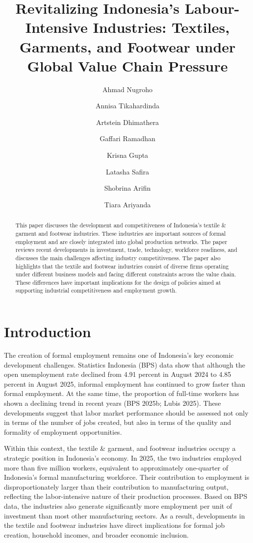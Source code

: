 \documentclass[
  manuscript=article,
  layout=publish,
  year=2026,
  volume=1,
]{den}
\title{Revitalizing Indonesia's Labour-Intensive Industries: Textiles,
Garments, and Footwear under Global Value Chain Pressure}
\author{Ahmad Nugroho}
\affiliation{Dewan Ekonomi Nasional}
\author{Annisa Tikahardinda}
\affiliation{Dewan Ekonomi Nasional}
\author{Artstein Dhimathera}
\affiliation{Dewan Ekonomi Nasional}
\author{Gaffari Ramadhan}
\affiliation{Dewan Ekonomi Nasional}
\author{Krisna Gupta \orcid{0000-0001-8695-0514}}
\affiliation{Dewan Ekonomi Nasional}
\author{Latasha Safira}
\affiliation{Dewan Ekonomi Nasional}
\author{Shobrina Arifin}
\affiliation{Dewan Ekonomi Nasional}
\author{Tiara Ariyanda}
\affiliation{Dewan Ekonomi Nasional}
\begin{document}
\begin{abstract}
This paper discusses the development and competitiveness of Indonesia's
textile \& garment and footwear industries. These industries are
important sources of formal employment and are closely integrated into
global production networks. The paper reviews recent developments in
investment, trade, technology, workforce readiness, and discusses the
main challenges affecting industry competitiveness. The paper also
highlights that the textile and footwear industries consist of diverse
firms operating under different business models and facing different
constraints across the value chain. These differences have important
implications for the design of policies aimed at supporting industrial
competitiveness and employment growth.
\end{abstract}

\section{Introduction}\label{introduction}

The creation of formal employment remains one of Indonesia's key
economic development challenges. Statistics Indonesia (BPS) data show
that although the open unemployment rate declined from 4.91 percent in
August 2024 to 4.85 percent in August 2025, informal employment has
continued to grow faster than formal employment. At the same time, the
proportion of full-time workers has shown a declining trend in recent
years (BPS 2025b; Lubis 2025). These developments suggest that labor
market performance should be assessed not only in terms of the number of
jobs created, but also in terms of the quality and formality of
employment opportunities.

Within this context, the textile \& garment, and footwear industries
occupy a strategic position in Indonesia's economy. In 2025, the two
industries employed more than five million workers, equivalent to
approximately one-quarter of Indonesia's formal manufacturing workforce.
Their contribution to employment is disproportionately larger than their
contribution to manufacturing output, reflecting the labor-intensive
nature of their production processes. Based on BPS data, the industries
also generate significantly more employment per unit of investment than
most other manufacturing sectors. As a result, developments in the
textile and footwear industries have direct implications for formal job
creation, household incomes, and broader economic inclusion.
\end{document}
